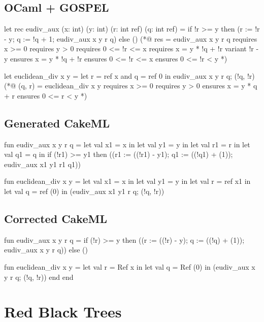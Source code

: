 \subsection*{OCaml + GOSPEL}

\begin{gospell}
let rec eudiv_aux (x: int) (y: int) (r: int ref) (q: int ref) =
  if !r >= y then (r := !r - y; q := !q + 1; eudiv_aux x y r q)
  else ()
(*@ res = eudiv_aux x y r q
    requires x >= 0
    requires y > 0
    requires 0 <= !r <= x
    requires x = y * !q + !r
    variant !r - y
    ensures x = y * !q + !r
    ensures 0 <= !r <= x
    ensures 0 <= !r < y *)

let euclidean_div x y =
    let r = ref x and q = ref 0 in 
  eudiv_aux x y r q;
  (!q, !r)
(*@ (q, r) = euclidean_div x y
    requires x >= 0
    requires y > 0
    ensures x = y * q + r
    ensures 0 <= r < y *)
\end{gospell}

\subsection*{Generated CakeML}

\begin{cakeml}
fun eudiv_aux x y r q = let val x1 = x in
  let val y1 = y in
  let val r1 = r in
  let val q1 = q in
  if (!r1) >= y1
  then ((r1 := ((!r1) - y1); q1 := ((!q1) + (1)); eudiv_aux x1 y1 r1 q1))

fun euclidean_div x y =
  let val x1 = x in
  let val y1 = y in
  let val r = ref x1 in
  let val q = ref (0) in (eudiv_aux x1 y1 r q; (!q, !r))
\end{cakeml}

\newpage

\subsection*{Corrected CakeML}

\begin{cakeml}
fun eudiv_aux x y r q =
  if (!r) >= y
  then ((r := ((!r) - y); q := ((!q) + (1)); eudiv_aux x y r q))
  else ()

fun euclidean_div x y =
  let val r = Ref x in
  let val q = Ref (0) in (eudiv_aux x y r q; (!q, !r)) 
    end end
\end{cakeml}

\section{Red Black Trees}

